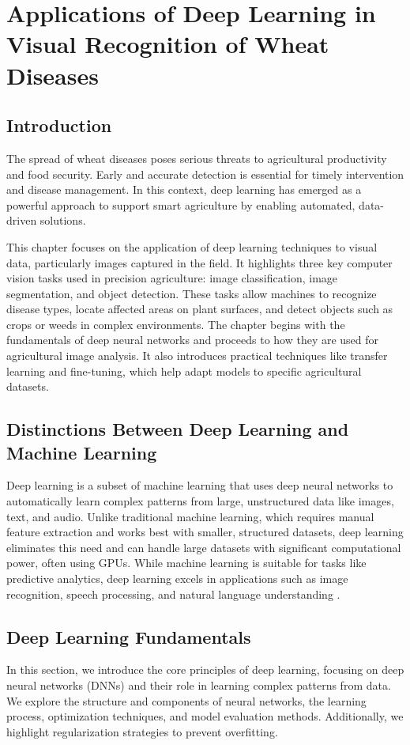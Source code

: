 
\chapter{Applications of Deep Learning in Visual Recognition of Wheat Diseases}

\section{Introduction}
The spread of wheat diseases poses serious threats to agricultural productivity and food security. Early and accurate detection is essential for timely intervention and disease management. In this context, deep learning has emerged as a powerful approach to support smart agriculture by enabling automated, data-driven solutions.

This chapter focuses on the application of deep learning techniques to visual data, particularly images captured in the field. It highlights three key computer vision tasks used in precision agriculture: image classification, image segmentation, and object detection. These tasks allow machines to recognize disease types, locate affected areas on plant surfaces, and detect objects such as crops or weeds in complex environments. The chapter begins with the fundamentals of deep neural networks and proceeds to how they are used for agricultural image analysis. It also introduces practical techniques like transfer learning and fine-tuning, which help adapt models to specific agricultural datasets.

\section{Distinctions Between Deep Learning and Machine Learning}
Deep learning is a subset of machine learning that uses deep neural networks to automatically learn complex patterns from large, unstructured data like images, text, and audio. Unlike traditional machine learning, which requires manual feature extraction and works best with smaller, structured datasets, deep learning eliminates this need and can handle large datasets with significant computational power, often using GPUs. While machine learning is suitable for tasks like predictive analytics, deep learning excels in applications such as image recognition, speech processing, and natural language understanding \parencite{AlvarezVanhard2021}.


\section{Deep Learning Fundamentals}
In this section, we introduce the core principles of deep learning, focusing on deep neural networks (DNNs) and their role in learning complex patterns from data. We explore the structure and components of neural networks, the learning process, optimization techniques, and model evaluation methods. Additionally, we highlight regularization strategies to prevent overfitting.

